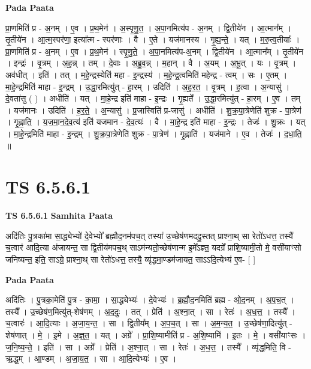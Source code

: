 \documentclass[17pt]{extarticle}
\begin{document}
\textbf{Pada Paata} \newline

प्रा॒णमिति॑ प्र - अ॒नम् । ए॒व । प्र॒थ॒मेन॑ । अ॒स्पृ॒णु॒त॒ । अ॒पा॒नमित्य॑प - अ॒नम् । द्वि॒तीये॑न । आ॒त्मान᳚म् । तृ॒तीये॑न । आ॒त्म॒स्पर॑णा॒ इत्या᳚त्म - स्पर॑णाः । वै । ए॒ते । यज॑मानस्य । गृ॒ह्य॒न्ते॒ । यत् । म॒रु॒त्व॒तीयाः᳚ । प्रा॒णमिति॑ प्र - अ॒नम् । ए॒व । प्र॒थ॒मेन॑ । स्पृ॒णु॒ते॒ । अ॒पा॒नमित्य॑प-अ॒नम् । द्वि॒तीये॑न । आ॒त्मान᳚म् । तृ॒तीये॑न । इन्द्रः॑ । वृ॒त्रम् । अ॒ह॒न्न् । तम् । दे॒वाः । अ॒ब्रु॒व॒न्न् । म॒हान् । वै । अ॒यम् । अ॒भू॒त् । यः । वृ॒त्रम् । अव॑धीत् । इति॑ । तत् । म॒हे॒न्द्रस्येति॑ महा - इ॒न्द्रस्य॑ । म॒हे॒न्द्र॒त्वमिति॑ महेन्द्र - त्वम् । सः । ए॒तम् । मा॒हे॒न्द्रमिति॑ माहा - इ॒न्द्रम् । उ॒द्धा॒रमित्यु॑त् - हा॒रम् । उदिति॑ । अ॒ह॒र॒त॒ । वृ॒त्रम् । ह॒त्वा । अ॒न्यासु॑ । दे॒वता॑सु ( ) । अधीति॑ । यत् । मा॒हे॒न्द्र इति॑ माहा - इ॒न्द्रः । गृ॒ह्यते᳚ । उ॒द्धा॒रमित्यु॑त् - हा॒रम् । ए॒व । तम् । यज॑मानः । उदिति॑ । ह॒र॒ते॒ । अ॒न्यासु॑ । प्र॒जास्विति॑ प्र-जासु॑ । अधीति॑ । शु॒क्र॒पा॒त्रेणेति॑ शुक्र - पा॒त्रेण॑ । गृ॒ह्णा॒ति॒ । य॒ज॒मा॒न॒दे॒व॒त्य॑ इति॑ यजमान - दे॒व॒त्यः॑ । वै । मा॒हे॒न्द्र इति॑ माहा - इ॒न्द्रः । तेजः॑ । शु॒क्रः । यत् । मा॒हे॒न्द्रमिति॑ माहा - इ॒न्द्रम् । शु॒क्र॒पा॒त्रेणेति॑ शुक्र - पा॒त्रेण॑ । गृ॒ह्णाति॑ । यज॑माने । ए॒व । तेजः॑ । द॒धा॒ति॒ ॥  \newline




\section*{ TS 6.5.6.1 }

\textbf{TS 6.5.6.1 } \newline
\textbf{Samhita Paata} \newline

अदि॑तिः पु॒त्रका॑मा सा॒द्ध्येभ्यो॑ दे॒वेभ्यो᳚ ब्रह्मौद॒नम॑पच॒त् तस्या॑ उ॒च्छेष॑णमददु॒स्तत् प्राश्ना॒थ् सा रेतो॑ऽधत्त॒ तस्यै॑ च॒त्वार॑ आदि॒त्या अ॑जायन्त॒ सा द्वि॒तीय॑मपच॒थ् साऽम॑न्यतो॒च्छेष॑णान्म इ॒मे᳚ऽज्ञ्त॒ यदग्रे᳚ प्राशि॒ष्यामी॒तो मे॒ वसी॑याꣳसो जनिष्यन्त॒ इति॒ साऽग्रे॒ प्राश्ना॒थ् सा रेतो॑ऽधत्त॒ तस्यै॒ व्यृ॑द्धमा॒ण्डम॑जायत॒ साऽऽदि॒त्येभ्य॑ ए॒व- [  ] \newline

\textbf{Pada Paata} \newline

अदि॑तिः । पु॒त्रका॒मेति॑ पु॒त्र - का॒मा॒ । सा॒द्ध्येभ्यः॑ । दे॒वेभ्यः॑ । ब्र॒ह्मौ॒द॒नमिति॑ ब्रह्म - ओ॒द॒नम् । अ॒प॒च॒त् । तस्यै᳚ । उ॒च्छेष॑ण॒मित्यु॑त्-शेष॑णम् । अ॒द॒दुः॒ । तत् । प्रेति॑ । अ॒श्ना॒त् । सा । रेतः॑ । अ॒ध॒त्त॒ । तस्यै᳚ । च॒त्वारः॑ । आ॒दि॒त्याः । अ॒जा॒य॒न्त॒ । सा । द्वि॒तीय᳚म् । अ॒प॒च॒त् । सा । अ॒म॒न्य॒त॒ । उ॒च्छेष॑णा॒दित्यु॑त् - शेष॑णात् । मे॒ । इ॒मे । अ॒ज्ञ्॒त॒ । यत् । अग्रे᳚ । प्रा॒शि॒ष्यामीति॑ प्र - अ॒शि॒ष्यामि॑ । इ॒तः । मे॒ । वसी॑याꣳसः । ज॒नि॒ष्य॒न्ते॒ । इति॑ । सा । अग्रे᳚ । प्रेति॑ । अ॒श्ना॒त् । सा । रेतः॑ । अ॒ध॒त्त॒ । तस्यै᳚ । व्यृ॑द्ध॒मिति॒ वि - ऋ॒द्ध॒म् । आ॒ण्डम् । अ॒जा॒य॒त॒ । सा । आ॒दि॒त्येभ्यः॑ । ए॒व ।  \newline
\end{document}
